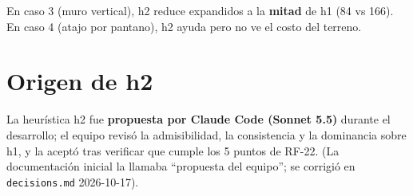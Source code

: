 En caso 3 (muro vertical), h2 reduce expandidos a la \textbf{mitad} de h1 (84 vs 166).
En caso 4 (atajo por pantano), h2 ayuda pero no ve el costo del terreno.

\section{Origen de h2}
\label{sec:origen-h2}

La heurística h2 fue \textbf{propuesta por Claude Code (Sonnet 5.5)} durante el desarrollo;
el equipo revisó la admisibilidad, la consistencia y la dominancia sobre h1, y la aceptó
tras verificar que cumple los 5 puntos de RF-22. (La documentación inicial la llamaba
``propuesta del equipo''; se corrigió en \texttt{decisions.md} 2026-10-17).